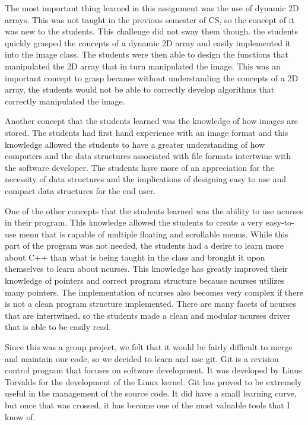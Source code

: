 \documentclass[pdftex, 11pt]{article}
\begin{document}
The most important thing learned in this assignment was the use of dynamic 2D arrays. This was not taught in the previous
semester of CS, so the concept of it was new to the students. This challenge did not sway them though. the students
quickly grasped the concepts of a dynamic 2D array and easily implemented it into the image class. The students were
then able to design the functions that manipulated the 2D array that in turn manipulated the image. This was an
important concept to grasp because without understanding the concepts of a 2D array, the students would not be able to
correctly develop algorithms that correctly manipulated the image. 

Another concept that the students learned was the knowledge of how images are stored. The students had first hand
experience with an image format and this knowledge allowed the students to have a greater understanding of how computers
and the data structures associated with file formats intertwine with the software developer. The students have more of
an appreciation for the necessity of data structures and the implications of designing easy to use and compact data
structures for the end user. 

One of the other concepts that the students learned was the ability to use ncurses in their program. This knowledge
allowed the students to create a very easy-to-use menu that is capable of multiple floating and scrollable menus. While
this part of the program was not needed, the students had a desire to learn more about C++ than what is being taught in
the class and brought it upon themselves to learn about ncurses. This knowledge has greatly improved their knowledge of
pointers and correct program structure because ncurses utilizes many pointers. The implementation of ncurses also becomes
very complex if there is not a clean program structure implemented. There are many facets of ncurses that are
intertwined, so the students made a clean and modular ncurses driver that is able to be easily read.

Since this was a group project, we felt that it would be fairly difficult to merge and maintain our code, so we decided
to learn and use git. Git is a revision control program that focuses on software development. It was developed by Linus
Torvalds for the development of the Linux kernel. Git has proved to be extremely useful in the management of the source
code. It did have a small learning curve, but once that was crossed, it has become one of the most valuable tools that I
know of.
\end{document}
